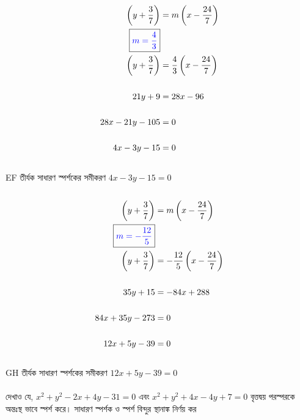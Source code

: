 \documentclass{article}
\begin{document}
\\
\begin{align*}
	\left(y+\frac{3}{7}\right)&=m\left(x-\frac{24}{7}\right)\\
	\boxed{\textcolor{blue}{m=\frac{4}{3}}}&\\
	\left(y+\frac{3}{7}\right)&=\frac{4}{3}\left(x-\frac{24}{7}\right)\\
	\\
	21y+9&=28x-96\\
	\\
	28x-21y-105&=0\\
	\\
	4x-3y-15&=0\\
\end{align*}
\\
EF তীর্যক সাধারণ স্পর্শকের সমীকরণ  $4x-3y-15=0$\\
\\ 
\begin{align*}
	\left(y+\frac{3}{7}\right)&=m\left(x-\frac{24}{7}\right)\\
	\boxed{\textcolor{blue}{m=-\frac{12}{5}}}&\\
	\left(y+\frac{3}{7}\right)&=-\frac{12}{5}\left(x-\frac{24}{7}\right)\\
	\\
	35y+15&=-84x+288\\
	\\
	84x+35y-273&=0\\
	\\
	12x+5y-39&=0\\
\end{align*}
\\
GH তীর্যক সাধারণ স্পর্শকের সমীকরণ  $12x+5y-39=0$\\
\\
	দেখাও যে, $x^2+y^2-2x+4y-31=0$ এবং $x^2+y^2+4x-4y+7=0$ বৃত্তদ্বয় পরস্পরকে অন্তঃস্থ ভাবে স্পর্শ করে। সাধারণ স্পর্শক ও স্পর্শ বিন্দুর স্থানাঙ্ক নির্ণয় কর \\ 
\\
\\
\\ 
\end{document}

